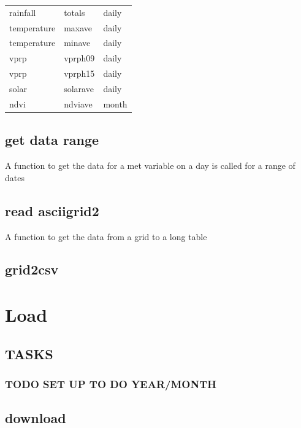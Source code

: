 \documentclass[a4paper]{article}
\begin{document}

\begin{center}
\begin{tabular}{lll}
 rainfall     &  totals    &  daily  \\
 temperature  &  maxave    &  daily  \\
 temperature  &  minave    &  daily  \\
 vprp         &  vprph09   &  daily  \\
 vprp         &  vprph15   &  daily  \\
 solar        &  solarave  &  daily  \\
 ndvi         &  ndviave   &  month  \\
\end{tabular}
\end{center}
\subsection{get data range}
\label{sec-3-3}

A function to get the data for a met variable on a day is called for a range of dates
\subsection{read asciigrid2}
\label{sec-3-4}

A function to get the data from a grid to a long table
\subsection{grid2csv}
\label{sec-3-5}
\section{Load}
\label{sec-4}
\subsection{TASKS}
\label{sec-4-1}
\subsubsection{\textbf{TODO} SET UP TO DO YEAR/MONTH}
\label{sec-4-1-1}
\subsection{download}
\label{sec-4-2}
\end{document}

